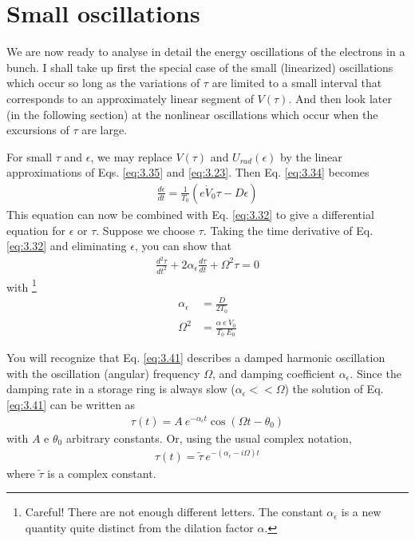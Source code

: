 \section{Small oscillations}\label{sec:3.5}
We are now ready to analyse in detail the energy oscillations of the electrons in a bunch. I shall take up first the special case of the small (linearized) oscillations which occur so long as the variations of $\tau$ are limited to a small interval that corresponds to an approximately linear segment of $V(\tau)$. And then look later (in the following section) at the nonlinear oscillations which occur when the excursions of $\tau$ are large.

For small $\tau$ and $\epsilon$, we may replace $V(\tau)$ and $U_{rad}(\epsilon)$ by the linear approximations of Eqs. \eqref{eq:3.35} and \eqref{eq:3.23}. Then Eq. \eqref{eq:3.34} becomes
\begin{align}
	\frac{d\epsilon}{dt} = \frac{1}{T_0}(e\dot{V}_0 \tau - D\epsilon)\label{eq:3.40}
\end{align}
This equation can now be combined with Eq. \eqref{eq:3.32} to give a differential equation for $\epsilon$ or $\tau$. Suppose we choose $\tau$. Taking the time derivative of Eq. \eqref{eq:3.32} and eliminating $\epsilon$, you can show that
\begin{align}
	\frac{d^2 \tau}{dt^2} + 2\alpha_\epsilon \frac{d\tau}{dt} + \Omega^2 \tau = 0\label{eq:3.41}
\end{align}
with \footnote{Careful! There are not enough different letters. The constant $\alpha_\epsilon$ is a new quantity quite distinct from the dilation factor $\alpha$.}
\begin{align}
	\alpha_\epsilon &= \frac{D}{2 T_0}\\
	\Omega^2 &= \frac{\alpha\ e\ \dot{V}_0}{T_0\ E_0}
\end{align}

You will recognize that Eq. \eqref{eq:3.41} describes a damped harmonic oscillation with the oscillation (angular) frequency $\Omega$, and damping coefficient $\alpha_\epsilon$. Since the damping rate in a storage ring is always slow ($\alpha_\epsilon << \Omega$) the solution of Eq. \eqref{eq:3.41} can be written as
\begin{align} \label{eq:3.44}
	\tau(t) = A\ e^{-\alpha_\epsilon t} \cos(\Omega t - \theta_0)
\end{align}
with $A$ e $\theta_0$ arbitrary constants. Or, using the usual complex notation,
\begin{align}
	\tau(t) = \tilde{\tau}\ e^{-(\alpha_\epsilon - i\Omega)t}
\end{align}
where $\tilde{\tau}$ is a complex constant.

